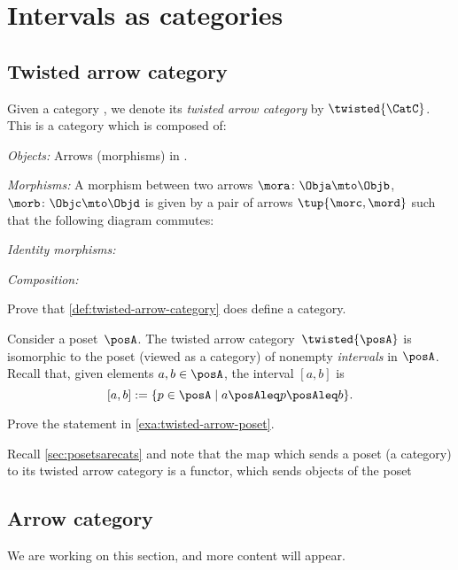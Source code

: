 \section{Intervals as categories}

\subsection{Twisted arrow category}



\begin{ctdefinition}\label{def:twisted-arrow-category}
  \label{def:twisted-arrow}
  Given a category \CatC, we denote its \emph{twisted arrow category} by $\twisted{\CatC}$. This is a category which is composed of:
  \begin{compactenum}
    \item \emph{Objects:} Arrows (morphisms) in \CatC.
    \item \emph{Morphisms:} A morphism between two arrows $\mora\colon \Obja \mto \Objb $, $\morb\colon \Objc \mto \Objd$ is given by a pair of arrows $\tup{\morc,\mord}$ such that the following diagram commutes:
    \begin{center}
    \end{center}
    \item \emph{Identity morphisms:}
    \item \emph{Composition:}
  \end{compactenum}
\end{ctdefinition}

\begin{gradedexercise}
Prove that \cref{def:twisted-arrow-category} does define a category.
\end{gradedexercise}


\begin{example}[Intervals]\label{exa:twisted-arrow-poset}
  Consider a poset~$\posA$. The twisted arrow category~$\twisted{\posA}$ is isomorphic to the poset (viewed as a category) of nonempty \emph{intervals} in $\posA$. Recall that, given elements $a, b \in \posA$, the interval $[a,b]$ is
  $$[a,b]:=\{p \in \posA \mid a\posAleq p \posAleq b\}.$$
\end{example}

\begin{exercise}
Prove the statement in \cref{exa:twisted-arrow-poset}.
\end{exercise}
\begin{solution}

\end{solution}
\begin{remark}
  Recall \cref{sec:posetsarecats} and note that the map which sends a poset (a category) to its twisted arrow category is a functor, which sends objects of the poset 
\end{remark}

\subsection{Arrow category}

We are working on this section, and more content will appear.



